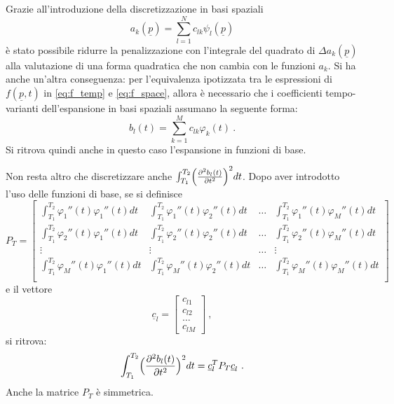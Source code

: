 \documentclass[a4paper,11pt,twoside,openright]{book}							%
\begin{document}
Grazie all'introduzione della discretizzazione in basi spaziali
$$
a_k(\underline p)=\sum_{l=1}^N c_{lk}\psi_l(\underline p)
$$
è stato possibile ridurre la penalizzazione con l'integrale del quadrato di $\Delta a_k(\underline p)$
alla valutazione di una forma quadratica che non cambia con le funzioni $a_k$. Si ha anche un'altra conseguenza: per l'equivalenza ipotizzata tra le espressioni di $f(\underline{p},t)$ in \ref{eq:f_temp} e \ref{eq:f_space}, allora è necessario che i coefficienti tempo-varianti dell'espansione in basi spaziali assumano la seguente forma:
$$
b_l(t)=\sum_{k=1}^M c_{lk}\varphi_k(t) \ .
$$
Si ritrova quindi anche in questo caso l'espansione in funzioni di base.

Non resta altro che discretizzare anche $\int_{T_1}^{T_2} \Bigl( \frac{\partial^2   b_l(t)   }{\partial t ^2} \Bigr)^2 dt$. Dopo aver introdotto l'uso delle funzioni di base, se si definisce 
 $$ P_T = \begin{bmatrix}
\int_{T_1}^{T_2} \varphi_1''(t) \varphi_1''(t) dt  & \int_{T_1}^{T_2} \varphi_1''(t) \varphi_2''(t) dt & \hdots & \int_{T_1}^{T_2} \varphi_1''(t) \varphi_M''(t) dt  \\
\int_{T_1}^{T_2} \varphi_2''(t) \varphi_1''(t) dt  & \int_{T_1}^{T_2} \varphi_2''(t) \varphi_2''(t) dt & \hdots & \int_{T_1}^{T_2} \varphi_2''(t) \varphi_M''(t) dt  \\
\vdots & \vdots & \hdots & \vdots \\
\int_{T_1}^{T_2} \varphi_M''(t) \varphi_1''(t) dt  & \int_{T_1}^{T_2} \varphi_M''(t) \varphi_2''(t) dt & \hdots & \int_{T_1}^{T_2} \varphi_M''(t) \varphi_M''(t) dt  \\
\end{bmatrix} $$
e il vettore $$
\underline{c}_l =
\begin{bmatrix}
c_{l1} \\ c_{l2} \\ \hdots \\ c_{lM}
\end{bmatrix} \ ,$$ si ritrova:
$$
\int_{T_1}^{T_2} \Bigl( \frac{\partial^2   b_l(t)   }{\partial t ^2} \Bigr)^2 dt = \underline{c}_l^T  P_T \underline{c}_l \ .
$$
Anche la matrice $P_T$ è simmetrica.
\end{document}
